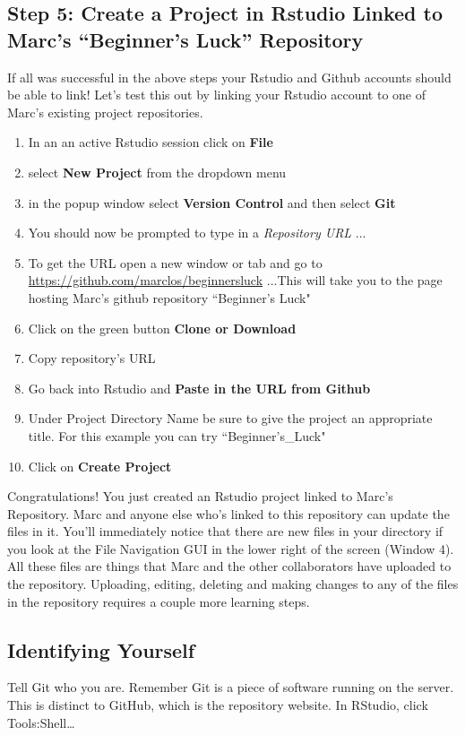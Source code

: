 \documentclass{article}\usepackage[]{graphicx}\usepackage[]{color}
\begin{document}
  \subsection*{Step 5: Create a Project in Rstudio Linked to Marc's ``Beginner's Luck'' Repository}
If all was successful in the above steps your Rstudio and Github accounts should be able to link! Let's test this out by linking your Rstudio account to one of Marc's existing project repositories. 
  \begin{enumerate}
  \item In an an active Rstudio session click on \textbf{File}
  \item select \textbf{New Project} from the dropdown menu
  \item in the popup window select \textbf{Version Control} and then select \textbf{Git}
  \item You should now be prompted to type in a \emph{Repository URL} ...
  \item To get the URL open a new window or tab and go to \url{https://github.com/marclos/beginnersluck} ...This will take you to the page hosting Marc's github repository ``Beginner's Luck"
  \item Click on the green button \textbf{Clone or Download}
  \item Copy repository's URL
  \item Go back into Rstudio and \textbf{Paste in the URL from Github}
  \item Under Project Directory Name be sure to give the project an appropriate title. For this example you can try ``Beginner's\_Luck"
  \item Click on \textbf{Create Project} 
  \end{enumerate} 
Congratulations! You just created an Rstudio project linked to Marc's Repository. Marc and anyone else who's linked to this repository can update the files in it. You'll immediately notice that there are new files in your directory if you look at the File Navigation GUI in the lower right of the screen (Window 4). All these files are things that Marc and the other collaborators have uploaded to the repository. Uploading, editing, deleting and making changes to any of the files in the repository requires a couple more learning steps. 

\subsection*{Identifying Yourself}
Tell Git who you are. Remember Git is a piece of software running on the server. This is distinct to GitHub, which is the repository website. In RStudio, click Tools:Shell\ldots
\end{document}
